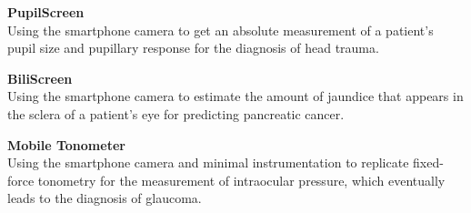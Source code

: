
\textbf{PupilScreen} \\
Using the smartphone camera to get an absolute measurement of a patient’s pupil size and pupillary response for the diagnosis of head trauma. \\
\vspace{5pt}

\textbf{BiliScreen} \\
Using the smartphone camera to estimate the amount of jaundice that appears in the sclera of a patient’s eye for predicting pancreatic cancer. \\
\vspace{5pt}

\textbf{Mobile Tonometer} \\
Using the smartphone camera and minimal instrumentation to replicate fixed-force tonometry for the measurement of intraocular pressure, which eventually leads to the diagnosis of glaucoma. \\
\vspace{5pt}
